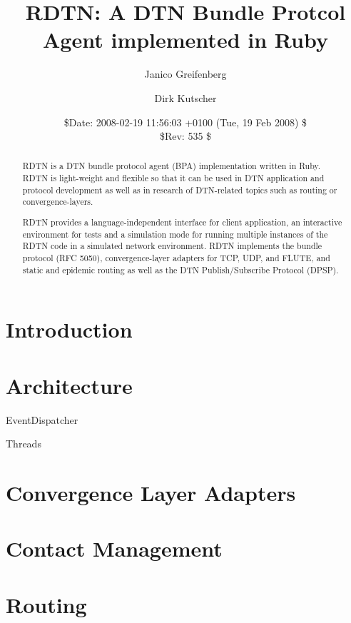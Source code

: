 \documentclass{article}
\begin{document}
\title{RDTN: A DTN Bundle Protcol Agent implemented in Ruby}

\author{Janico Greifenberg \and Dirk Kutscher}
\date{\$Date: 2008-02-19 11:56:03 +0100 (Tue, 19 Feb 2008) \$\\
\$Rev: 535 \$}

\maketitle

\begin{abstract}

RDTN is a DTN bundle protocol agent (BPA) implementation written in Ruby. RDTN
is light-weight and flexible so that it can be used in DTN application and
protocol development as well as in research of DTN-related topics such as
routing or convergence-layers. 

RDTN provides a language-independent interface for client application, an
interactive environment for tests and a simulation mode for running multiple
instances of the RDTN code in a simulated network environment. RDTN implements
the bundle protocol (RFC 5050), convergence-layer adapters for TCP, UDP, and
FLUTE, and static and epidemic routing as well as the DTN Publish/Subscribe
Protocol (DPSP).

\end{abstract}

\section{Introduction}\label{sec.intro}

\section{Architecture}\label{sec.arch}

EventDispatcher

Threads

\section{Convergence Layer Adapters}\label{sec.cl}

\section{Contact Management}\label{sec.contact-mngt}

\section{Routing}\label{sec.routing}
\end{document}
